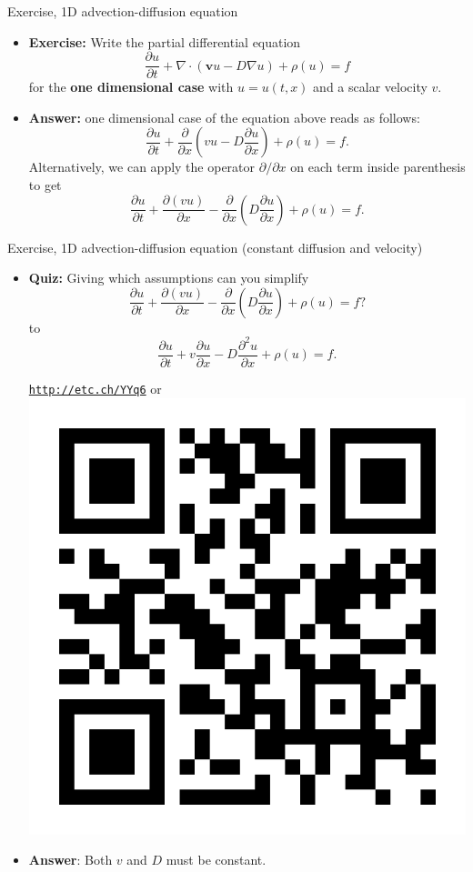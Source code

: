 %
\begin{frame}{Exercise, 1D advection-diffusion equation}
\begin{itemize}
\item \alert{\textbf{Exercise:}} Write the partial differential equation
\[
\frac{\partial u}{\partial t}+\nabla\cdot(\boldsymbol{v}u-D\nabla u)  + \rho (u) =f
\]
for the \textbf{one dimensional case} with $u=u(t,x)$ and a scalar velocity $v$. 
\hiddenpause
\item \textbf{Answer:} one dimensional case of the equation above reads as follows:
%
\[
\frac{\partial u}{\partial t}+\frac{\partial}{\partial x}\left(vu-D\frac{\partial u}{\partial x}\right)  + \rho (u) =f.
\]
Alternatively, we can apply the operator $\partial/\partial x$ on
each term inside parenthesis to get 
\[
\frac{\partial u}{\partial t}+\frac{\partial(vu)}{\partial x}-\frac{\partial}{\partial x}\left(D\frac{\partial u}{\partial x}\right)  + \rho (u) = f.
\]
\end{itemize}
\end{frame}
%
%
\begin{frame}{Exercise, 1D advection-diffusion equation (constant diffusion and velocity)}
\begin{itemize}
\item \alert{\textbf{Quiz:}} Giving which assumptions can you simplify
\[
\frac{\partial u}{\partial t}+\frac{\partial(vu)}{\partial x}-\frac{\partial}{\partial x}\left(D\frac{\partial u}{\partial x}\right)+ \rho (u) =f?
\]
%
to 
%
\[
\frac{\partial u}{\partial t}+v\frac{\partial u}{\partial x}-D\frac{\partial^{2}u}{\partial x}+ \rho (u) =f.
\]
\begin{center}
		\href{http://etc.ch/YYq6}{\textcolor{indigo(dye)}{\tt http://etc.ch/YYq6}} \quad or \quad 
		\includegraphics[height=0.2\columnwidth]{figures/reactive-transport/polls.png}
	\end{center}
\hiddenpause
\item \alert{\textbf{Answer}}: Both $v$ and $D$ must be constant.
\end{itemize}
\end{frame}
